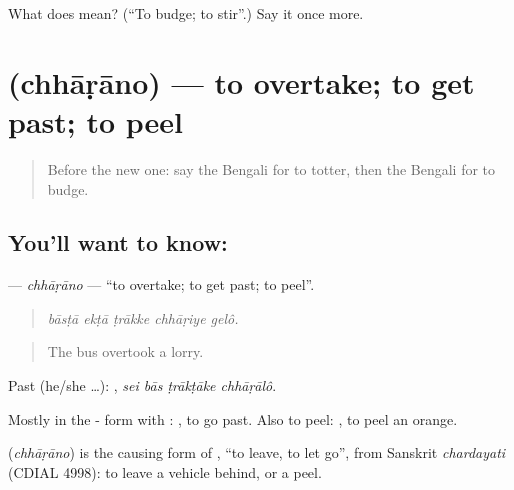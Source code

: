 \begin{tcolorbox}[breakable,colback=teal!4,colframe=teal!35!black,title={Before you move on}]
What does  mean? (\textquotedblleft{}To budge; to stir\textquotedblright{}.) Say it once more.
\end{tcolorbox}
\section[\texorpdfstring{\bn{ছাড়ানো} (chhāṛāno)}{ছাড়ানো (chhāṛāno)}]{ (chhāṛāno) — to overtake; to get past; to peel}

\label{lesson:BN-C391-chharano}



\begin{quote}
Before the new one: say the Bengali for to totter, then the Bengali for to budge.
\end{quote}

\subsection*{You'll want to know: }
\textbf{} — \emph{chhāṛāno} — \textquotedblleft{}to overtake; to get past; to peel\textquotedblright{}.

\begin{quote}
    
\end{quote}

\begin{quote}
\emph{bāsṭā ekṭā ṭrākke chhāṛiye gelô.}
\end{quote}

\begin{quote}
The bus overtook a lorry.
\end{quote}

Past (he/she …):    , \emph{sei bās ṭrākṭāke chhāṛālô}.

Mostly in the - form with :  , to go past. Also to peel:  , to peel an orange.

\begin{cousinweb}
\textbf{} (\emph{chhāṛāno}) is the causing form of \textbf{}, \textquotedblleft{}to leave, to let go\textquotedblright{}, from Sanskrit \emph{chardayati} (CDIAL 4998): to leave a vehicle behind, or a peel.
\end{cousinweb}

